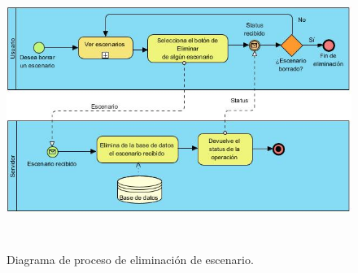 \begin{figure}[h!]
	\centering
	\includegraphics[width=17cm,height=9cm]{imagenes/desarrollo/diagramas/BPMN_DELETE_SCENARIOS.jpg}
	\caption{Diagrama de proceso de eliminación de escenario.}
	\label{fig:deletesc}
\end{figure}

\clearpage